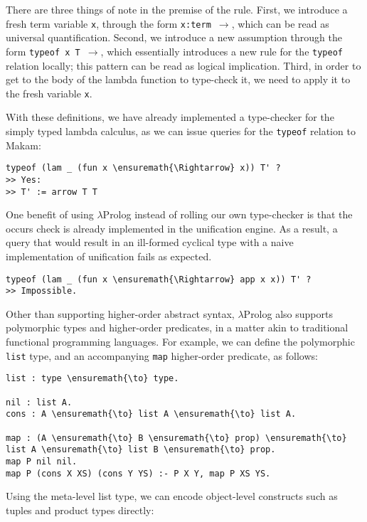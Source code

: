 There are three things of note in the premise of the rule. First, we
introduce a fresh term variable \texttt{x}, through the form
\texttt{x:term\ \ensuremath{\to}}, which can be read as universal
quantification. Second, we introduce a new assumption through the form
\texttt{typeof\ x\ T\ \ensuremath{\to}}, which essentially introduces a
new rule for the \texttt{typeof} relation locally; this pattern can be
read as logical implication. Third, in order to get to the body of the
lambda function to type-check it, we need to apply it to the fresh
variable \texttt{x}.

With these definitions, we have already implemented a type-checker for
the simply typed lambda calculus, as we can issue queries for the
\texttt{typeof} relation to Makam:

\begin{verbatim}
typeof (lam _ (fun x \ensuremath{\Rightarrow} x)) T' ?
>> Yes:
>> T' := arrow T T
\end{verbatim}

One benefit of using \ensuremath{\lambda}Prolog instead of rolling our own type-checker is
that the occurs check is already implemented in the unification engine.
As a result, a query that would result in an ill-formed cyclical type
with a naive implementation of unification fails as expected.

\begin{verbatim}
typeof (lam _ (fun x \ensuremath{\Rightarrow} app x x)) T' ?
>> Impossible.
\end{verbatim}

Other than supporting higher-order abstract syntax, \ensuremath{\lambda}Prolog also
supports polymorphic types and higher-order predicates, in a matter akin
to traditional functional programming languages. For example, we can
define the polymorphic \texttt{list} type, and an accompanying
\texttt{map} higher-order predicate, as follows:

\begin{verbatim}
list : type \ensuremath{\to} type.

nil : list A.
cons : A \ensuremath{\to} list A \ensuremath{\to} list A.

map : (A \ensuremath{\to} B \ensuremath{\to} prop) \ensuremath{\to} list A \ensuremath{\to} list B \ensuremath{\to} prop.
map P nil nil.
map P (cons X XS) (cons Y YS) :- P X Y, map P XS YS.
\end{verbatim}

Using the meta-level list type, we can encode object-level constructs
such as tuples and product types directly:

